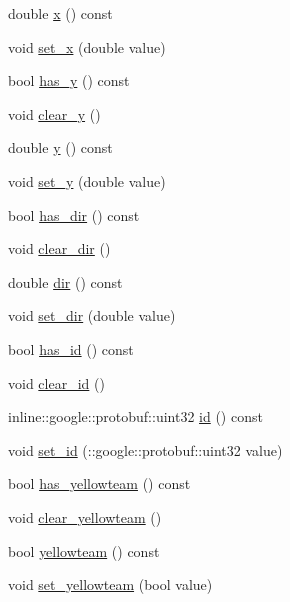 \begin{DoxyCompactItemize}
\item 
double \hyperlink{classgr_sim___robot_replacement_a6171256fdb82fb8fb5309fb26f86936f}{x} () const 
\item 
void \hyperlink{classgr_sim___robot_replacement_a84506314bef3882fe64f56983d40da86}{set\-\_\-x} (double value)
\item 
bool \hyperlink{classgr_sim___robot_replacement_ad6e3855d3220c7f6c68351d0c595c9fb}{has\-\_\-y} () const 
\item 
void \hyperlink{classgr_sim___robot_replacement_a0aeb6068df9e0ff2fcfd052120199c05}{clear\-\_\-y} ()
\item 
double \hyperlink{classgr_sim___robot_replacement_aeea1c17150b7a1fca390c10cfe6224af}{y} () const 
\item 
void \hyperlink{classgr_sim___robot_replacement_aa15a92e8cdfbd4b0c61279b12b0c2352}{set\-\_\-y} (double value)
\item 
bool \hyperlink{classgr_sim___robot_replacement_a0c453b87b3fece57ebcad6616ced92d0}{has\-\_\-dir} () const 
\item 
void \hyperlink{classgr_sim___robot_replacement_aa546a3c083a9b325b32163cef70c690a}{clear\-\_\-dir} ()
\item 
double \hyperlink{classgr_sim___robot_replacement_ac409ae3d9f9a9bb7bd3e7d137acef23a}{dir} () const 
\item 
void \hyperlink{classgr_sim___robot_replacement_ae3ee757cfd77780a23fdbd45b2ec69ca}{set\-\_\-dir} (double value)
\item 
bool \hyperlink{classgr_sim___robot_replacement_af957b1d39930964f86fb528936d94cbf}{has\-\_\-id} () const 
\item 
void \hyperlink{classgr_sim___robot_replacement_a6932bd69a31da0d05902885be404df94}{clear\-\_\-id} ()
\item 
inline\-::google\-::protobuf\-::uint32 \hyperlink{classgr_sim___robot_replacement_a2294285cae28c463a002885f0253f6d5}{id} () const 
\item 
void \hyperlink{classgr_sim___robot_replacement_a32508c8c7673ea2656c8344833f77b9c}{set\-\_\-id} (\-::google\-::protobuf\-::uint32 value)
\item 
bool \hyperlink{classgr_sim___robot_replacement_a75517bc58bf148db35c91987f5e15b88}{has\-\_\-yellowteam} () const 
\item 
void \hyperlink{classgr_sim___robot_replacement_a902a3c59ead5819f0ae0537f685e87f4}{clear\-\_\-yellowteam} ()
\item 
bool \hyperlink{classgr_sim___robot_replacement_a8549b89c9e9e10c042f87d7d60e569da}{yellowteam} () const 
\item 
void \hyperlink{classgr_sim___robot_replacement_ac696c19db51a85d27d4740da38b13213}{set\-\_\-yellowteam} (bool value)
\end{DoxyCompactItemize}
